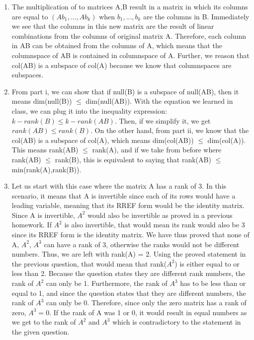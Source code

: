 \documentclass{article}
\begin{document}
\begin{enumerate}
\begin{enumerate}
\item The multiplication of to matrices A,B result in a matrix in which its columns are equal to $(A b_1,..., A b_k)$ when $b_1,...,b_k$ are the columns in B. Immediately we see that the columns in this new matrix are the result of linear combinations from the columns of original matrix A. Therefore, each column in AB can be obtained from the columns of A, which means that the columnspace of AB is contained in columnspace of A. Further, we reason that col(AB) is a subspace of col(A) because we know that columnspaces are subspaces.

\item From part i, we can show that if null(B) is a subspace of null(AB), then it means dim(null(B)) $\leq$ dim(null(AB)). With the equation we learned in class, we can plug it into the inequality expression: $k - rank(B) \leq k - rank(AB)$. Then, if we simplify it, we get $rank(AB) \leq rank(B)$. On the other hand, from part ii, we know that the col(AB) is a subspace of col(A), which means dim(col(AB)) $\leq$ dim(col(A)). This means rank(AB) $\leq$ rank(A), and if we take from before where rank(AB) $\leq$ rank(B), this is equivalent to saying that rank(AB) $\leq$ min(rank(A),rank(B)). 

\item Let us start with this case where the matrix A has a rank of 3. In this scenario, it means that A is invertible since each of its rows would have a leading variable, meaning that its RREF form would be the identity matrix. Since A is invertible, $A^2$ would also be invertible as proved in a previous homework. If $A^2$ is also invertible, that would mean its rank would also be 3 since its RREF form is the identity matrix. We have thus proved that none of A, $A^2$, $A^3$ can have a rank of 3, otherwise the ranks would not be different numbers. Thus, we are left with rank(A) = 2. Using the proved statement in the previous question, that would mean that rank($A^2$) is either equal to or less than 2. Because the question states they are different rank numbers, the rank of $A^2$ can only be 1. Furthermore, the rank of $A^3$ has to be less than or equal to 1, and since the question states that they are different numbers, the rank of $A^3$ can only be 0. Therefore, since only the zero matrix has a rank of zero, $A^3 = 0$. If the rank of A was 1 or 0, it would result in equal numbers as we get to the rank of $A^2$ and $A^3$ which is contradictory to the statement in the given question.

\end{enumerate}

\end{enumerate}
\end{document}
